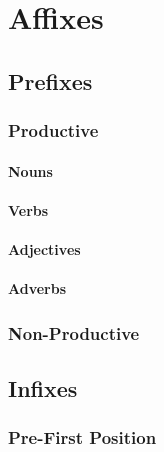 \chapter{Affixes}

\section{Prefixes}
\subsection{Productive}
\subsubsection{Nouns}

















\subsubsection{Verbs}


\subsubsection{Adjectives}



\subsubsection{Adverbs}

\subsection{Non-Productive}




\section{Infixes}
\subsection{Pre-First Position}


